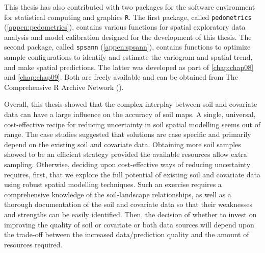 This thesis has also contributed with two packages for the software environment for statistical computing and 
graphics \texttt{R}. The first package, called \texttt{pedometrics} (\autoref{appen:pedometrics}), contains 
various functions for spatial exploratory data analysis and model calibration designed for the development of 
this thesis. The second package, called \texttt{spsann} (\autoref{appen:spsann}), contains functions to 
optimize sample configurations to identify and estimate the variogram and spatial trend, and make spatial 
predictions. The latter was developed as part of \autoref{chap:chap08} and \autoref{chap:chap09}. Both are 
freely available and can be obtained from The Comprehensive R Archive Network (\cran).

Overall, this thesis showed that the complex interplay between soil and covariate data can have a large 
influence on the accuracy of soil maps. A single, universal, cost-effective recipe for reducing uncertainty 
in soil spatial modelling seems out of range. The case studies suggested that solutions are case specific and 
primarily depend on the existing soil and covariate data. Obtaining more soil samples showed to be an efficient 
strategy provided the available resources allow extra sampling. Otherwise, deciding upon cost-effective ways of 
reducing uncertainty requires, first, that we explore the full potential of existing soil and covariate 
data using robust spatial modelling techniques. Such an exercise requires a comprehensive knowledge of the 
soil-landscape relationships, as well as a thorough documentation of the soil and covariate data so that their 
weaknesses and strengths can be easily identified. Then, the decision of whether to invest on improving the 
quality of soil or covariate or both data sources will depend upon the trade-off between the increased 
data/prediction quality and the amount of resources required.
